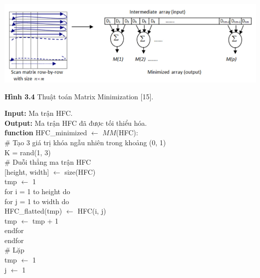 \begin{center}
    \includegraphics[scale=0.6]{Figures/fig21.png}
    \par \textbf {Hình 3.4} Thuật toán Matrix Minimization [15].
\end{center}
\begin{algorithm}[H]
\textbf{Input: } Ma trận HFC.\\
\textbf{Output: } Ma trận HFC đã được tối thiểu hóa.\\
\textbf{function } HFC\_minimized $\leftarrow$ $MM$(HFC):\\
\hspace{10mm} \# Tạo 3 giá trị khóa ngẫu nhiên trong khoảng (0, 1)\\
\hspace{10mm} K = rand(1, 3)\\
\hspace{10mm} \# Duỗi thẳng ma trận HFC\\
\hspace{10mm} [height, width] $\leftarrow$ size(HFC)\\
\hspace{10mm} tmp $\leftarrow$ 1\\
\hspace{10mm} for i = 1 to height do\\
\hspace{20mm} for j = 1 to width do\\
\hspace{30mm} HFC\_flatted(tmp) $\leftarrow$ HFC(i, j)\\
\hspace{30mm} tmp $\leftarrow$ tmp + 1\\
\hspace{20mm} endfor\\
\hspace{10mm} endfor\\
\hspace{10mm} \# Lặp\\
\hspace{10mm} tmp $\leftarrow$ 1\\
\hspace{10mm} j $\leftarrow$ 1\\

\end{algorithm}
